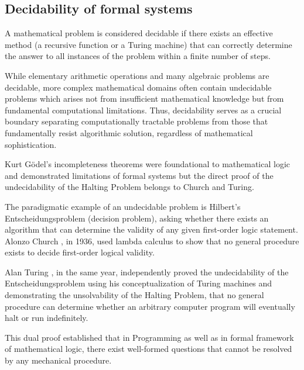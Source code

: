 \documentclass[12pt, a4paper]{article}
\begin{document}
\subsection{Decidability of formal systems}

A mathematical problem is considered decidable if there exists an effective method (a recursive function or a Turing machine) that can correctly determine the answer to all instances of the problem within a finite number of steps. 

While elementary arithmetic operations and many algebraic problems are decidable, more complex mathematical domains often contain undecidable problems which arises not from insufficient mathematical knowledge but from fundamental computational limitations. Thus, decidability serves as a crucial boundary separating computationally tractable problems from those that fundamentally resist algorithmic solution, regardless of mathematical sophistication.

Kurt Gödel's incompleteness theorems \cite{godel1931} were foundational to mathematical logic and demonstrated limitations of formal systems but the direct proof of the undecidability of the Halting Problem belongs to Church and Turing.

The paradigmatic example of an undecidable problem is Hilbert's Entscheidungsproblem (decision problem), asking whether there exists an algorithm that can determine the validity of any given first-order logic statement. Alonzo Church \cite{church1936note}, in 1936, used lambda calculus to show that no general procedure exists to decide first-order logical validity.

Alan Turing \cite{turing1936computable}, in the same year, independently proved the undecidability of the Entscheidungsproblem using his conceptualization of Turing machines and demonstrating the unsolvability of the Halting Problem, that no general procedure can determine whether an arbitrary computer program will eventually halt or run indefinitely. 

This dual proof established that in Programming as well as in formal framework of mathematical logic, there exist well-formed questions that cannot be resolved by any mechanical procedure.
\end{document}
